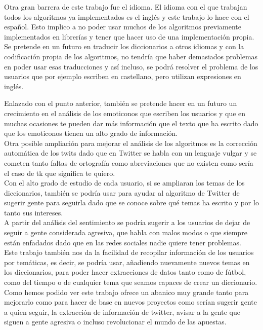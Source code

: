 \documentclass[../all.tex]{subfiles}
\begin{document}
Otra gran barrera de este trabajo fue el idioma. El idioma con el que trabajan todos los algoritmos ya implementados es el inglés y este trabajo lo hace con el español. Esto implico a no poder usar muchos de los algoritmos previamente implementados en librerías y tener que hacer uso de una implementación propia. Se pretende en un futuro en traducir los diccionarios a otros idiomas y con la codificación propia de los algoritmos, no tendría que haber demasiados problemas en poder usar esas traducciones y así incluso, se podrá resolver el problema de los usuarios que por ejemplo escriben en castellano, pero utilizan expresiones en inglés.

Enlazado con el punto anterior, también se pretende hacer en un futuro un crecimiento en el análisis de los emoticonos que escriben los usuarios y que en muchas ocasiones te pueden dar más información que el texto que ha escrito dado que los emoticonos tienen un alto grado de información.\\

Otra posible ampliación para mejorar el análisis de los algoritmos es la corrección automática de los twits dado que en Twitter se habla con un lenguaje vulgar y se cometen tanto faltas de ortografía como abreviaciones que no existen como sería el caso de tk que significa te quiero.\\

Con el alto grado de estudio de cada usuario, si se ampliaran los temas de los diccionarios, también se podría usar para ayudar al algoritmo de Twitter de sugerir gente para seguirla dado que se conoce sobre qué temas ha escrito y por lo tanto sus intereses.\\

A partir del análisis del sentimiento se podría sugerir a los usuarios de dejar de seguir a gente considerada agresiva, que habla con malos modos o que siempre están enfadados dado que en las redes sociales nadie quiere tener problemas.\\

Este trabajo también nos da la facilidad de recopilar información de los usuarios por temáticas, es decir, se podría usar, añadiendo nuevamente nuevos temas en los diccionarios, para poder hacer extracciones de datos tanto como de fútbol, como del tiempo o de cualquier tema que seamos capaces de crear un diccionario.\\

Como hemos podido ver este trabajo ofrece un abanico muy grande tanto para mejorarlo como para hacer de base en nuevos proyectos como serían sugerir gente a quien seguir, la extracción de información de twitter, avisar a la gente que siguen a gente agresiva o incluso revolucionar el mundo de las apuestas.
\end{document}
